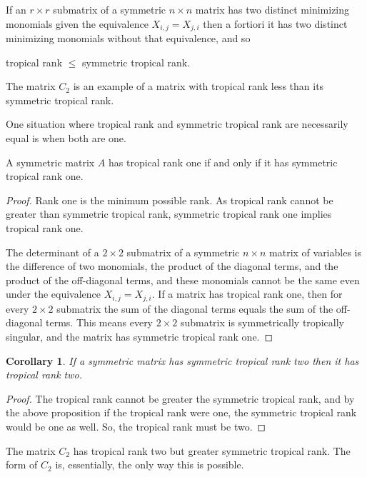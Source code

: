 \documentclass{article}
\begin{document}
If an $r \times r$ submatrix of a symmetric $n \times n$ matrix has two distinct minimizing monomials given the equivalence $X_{i,j} = X_{j,i}$ then a fortiori it has two distinct minimizing monomials without that equivalence, and so
\begin{center}
  tropical rank $\leq$ symmetric tropical rank.
\end{center}
The matrix $C_{2}$ is an example of a matrix with tropical rank less than its symmetric tropical rank.

One situation where tropical rank and symmetric tropical rank are necessarily equal is when both are one.

\begin{prop}
  A symmetric matrix $A$ has tropical rank one if and only if it has symmetric tropical rank one.
\end{prop}

\begin{proof}
  Rank one is the minimum possible rank. As tropical rank cannot be greater than symmetric tropical rank, symmetric tropical rank one implies tropical rank one.
  
  The determinant of a $2 \times 2$ submatrix of a symmetric $n \times n$ matrix of variables is the difference of two monomials, the product of the diagonal terms, and the product of the off-diagonal terms, and these monomials cannot be the same even under the equivalence $X_{i,j} = X_{j,i}$. If a matrix has tropical rank one, then for every $2 \times 2$ submatrix the sum of the diagonal terms equals the sum of the off-diagonal terms. This means every $2 \times 2$ submatrix is symmetrically tropically singular, and the matrix has symmetric tropical rank one. 
\end{proof}

\newtheorem{cor}{Corollary}
\begin{cor}
  If a symmetric matrix has symmetric tropical rank two then it has tropical rank two.
\end{cor}

\begin{proof}
  The tropical rank cannot be greater the symmetric tropical rank, and by the above proposition if the tropical rank were one, the symmetric tropical rank would be one as well. So, the tropical rank must be two.
\end{proof}

The matrix $C_{2}$ has tropical rank two but greater symmetric tropical rank. The form of $C_{2}$ is, essentially, the only way this is possible.
\end{document}
